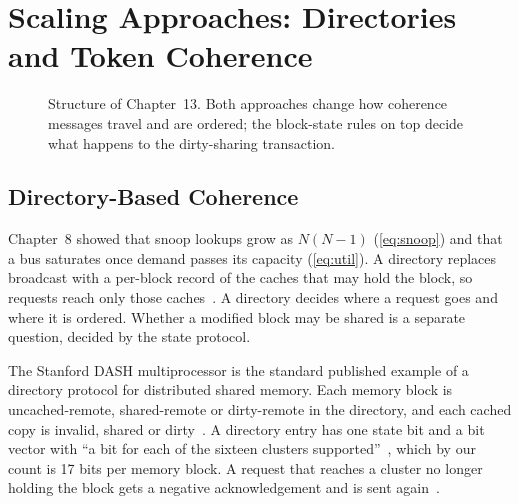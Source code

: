 \chapter{Scaling Approaches: Directories and Token Coherence}
\label{ch:scaling-approaches}

\begin{figure}[htbp]
\centering
{}
\caption[]{Structure of Chapter~13. Both approaches change
how coherence messages travel and are ordered; the block-state rules on top
decide what happens to the dirty-sharing transaction.}
\label{fig:ch13-map}
\end{figure}

\section{Directory-Based Coherence}
\label{sec:scal-dir}
%

Chapter~8 showed that snoop lookups grow as $N(N-1)$ (\cref{eq:snoop}) and that a
bus saturates once demand passes its capacity (\cref{eq:util}). A
\gls{directory} replaces broadcast with a per-block record
of the caches that may hold the block, so requests reach only those
caches~\cite{censier1978directory}. A directory decides where a request goes and
where it is ordered. Whether a modified block may be shared is a separate
question, decided by the state protocol.

The Stanford DASH multiprocessor is the standard published example of a directory
protocol for distributed shared memory. Each memory block is uncached-remote,
shared-remote or dirty-remote in the directory, and each cached copy is invalid,
shared or dirty~\cite[\S4]{lenoski1990dash}. A directory entry has one state bit and
a bit vector with ``a bit for each of the sixteen clusters
supported''~\cite[\S3]{lenoski1990dash}, which by our count is 17 bits per memory
block. A request that reaches a cluster no longer holding the block gets a negative
acknowledgement and is sent again~\cite[\S4.1, \S4.6]{lenoski1990dash}.

